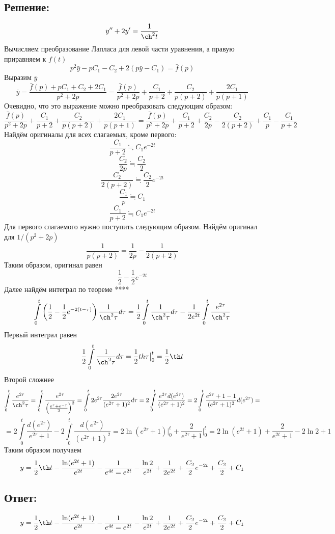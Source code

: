 \documentclass{article}
\begin{document}
	\subsection{Решение:}
	\[y'' + 2y' = \frac{1}{\ch^2t}\]
	Вычисляем преобразование Лапласа для левой части уравнения, а правую приравняем к $f(t)$
	\[p^2\bar{y}-pC_1-C_2 + 2(p\bar{y} - C_1) = \bar{f}(p)\]
	Выразим $\bar{y}$
	\[\bar{y} = \frac{\bar{f}(p) + pC_1+C_2+2C_1}{p^2+2p} = \frac{\bar{f}(p)}{p^2+2p} +\frac{C_1}{p+2}+\frac{C_2}{p(p+2)}+\frac{2C_1}{p(p+1)}\]
	Очевидно, что это выражение можно преобразовать следующим образом:
	\[\frac{\bar{f}(p)}{p^2+2p} +\frac{C_1}{p+2}+\frac{C_2}{p(p+2)}+\frac{2C_1}{p(p+1)} = \frac{\bar{f}(p)}{p^2+2p} +\frac{C_1}{p+2}+\frac{C_2}{2p}-\frac{C_2}{2(p+2)}+\frac{C_1}{p} - \frac{C_1}{p+2}\]
	Найдём оригиналы для всех слагаемых, кроме первого:
	\[\frac{C_1}{p+2} \fallingdotseq  C_1e^{-2t}\]
	\[\frac{C_2}{2p}\fallingdotseq\frac{C_2}{2}\]
	\[\frac{C_2}{2(p+2)} \fallingdotseq \frac{C_2}{2}e^{-2t}\]
	\[\frac{C_1}{p} \fallingdotseq C_1\]
	\[\frac{C_1}{p+2} \fallingdotseq C_1e^{-2t}\]
	Для первого слагаемого нужно поступить следующим образом.\newline
	Найдём оригинал для $1/(p^2+2p)$
	\[\frac{1}{p(p+2)} = \frac{1}{2p} - \frac{1}{2(p+2)}\]
	Таким образом, оригинал равен
	\[\frac{1}{2} - \frac{1}{2}e^{-2t}\]
	Далее найдём интеграл по теореме ****
	\[\int\limits_{0}^t \left(\frac{1}{2} -\frac{1}{2}e^{-2(t-\tau)}\right)\frac{1}{\ch^2\tau}d\tau=\frac{1}{2}\int\limits_{0}^t \frac{1}{\ch^2\tau}d\tau - \frac{1}{2e^{2t}}\int\limits_{0}^t \frac{e^{2\tau}}{\ch^2\tau}\]
	Первый интеграл равен
	\[\frac{1}{2}\int\limits_{0}^t \frac{1}{\ch^2\tau}d\tau = \frac{1}{2}th\tau\big|_0^t = \frac{1}{2}\th t\]
	Второй сложнее
	\[\int\limits_{0}^t \frac{e^{2\tau}}{\ch^2\tau} = \int\limits_{0}^t \frac{e^{2\tau}}{\left(\frac{e^\tau + e^{-\tau}}{2}\right)^2}=\int\limits_{0}^t 2e^{2\tau} \frac{2e^{2\tau}}{(e^{2\tau}+1)^2}d\tau = 2\int\limits_{0}^t\frac{e^{2\tau}d(e^{2\tau})}{(e^{2\tau} + 1)^2} = 2\int\limits_{0}^t\frac{e^{2\tau}+1-1}{(e^{2\tau} + 1)^2}d(e^{2\tau}) =\]
	\[=2\int\limits_{0}^t\frac{d(e^{2\tau})}{e^{2\tau} + 1} - 2 \int\limits_{0}^t\frac{d(e^{2\tau})}{(e^{2\tau} + 1)^2} = 2 \ln {(e^{2\tau} + 1)} \big|_0^t + \frac{2}{e^{2\tau} +1} \big|_0^t =  2\ln(e^{2t} + 1) + \frac{2}{e^{2t} +1} - 2\ln2 +1 \]
	Таким образом получаем 
	\[y = \frac{1}{2}\th t -\frac{\ln(e^{2t} + 1)}{e^{2t}} - \frac{1}{e^{4t} = e^{2t}} - \frac{\ln2}{e^{2t}} + \frac{1}{2e^{2t}} + \frac{C_2}{2}e^{-2t} + \frac{C_2}{2} + C_1\]
	\subsection{Ответ:}
	\[y = \frac{1}{2}\th t -\frac{\ln(e^{2t} + 1)}{e^{2t}} - \frac{1}{e^{4t} = e^{2t}} - \frac{\ln2}{e^{2t}} + \frac{1}{2e^{2t}} + \frac{C_2}{2}e^{-2t} + \frac{C_2}{2} + C_1\]
	
\end{document}
